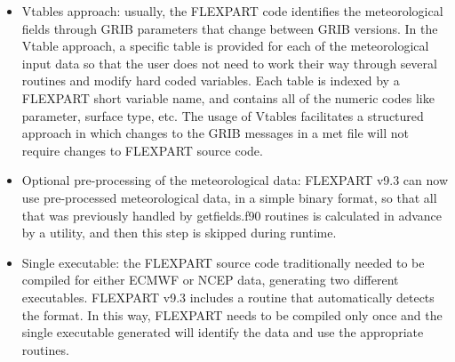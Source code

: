 \documentclass{egu}                  %
\begin{document}
\begin{itemize} 

\item Vtables approach: usually, the FLEXPART code identifies the meteorological fields through GRIB parameters that change between GRIB versions. In the Vtable approach, a specific table is provided for each of the meteorological input data so that the user does not need to work their way through several routines and modify hard coded variables. Each table is indexed by a FLEXPART short variable name, and contains all of the numeric codes like parameter, surface type, etc. The usage of Vtables facilitates a structured approach in which changes to the GRIB messages in a met file will not require changes to FLEXPART source code.  

\item Optional pre-processing of the meteorological data: FLEXPART v9.3 can now use pre-processed meteorological data, in a simple binary format, so that all that was previously handled by getfields.f90 routines is calculated in advance by a utility, and then this step is  skipped during runtime.

\item Single executable: the FLEXPART source code traditionally needed to be compiled for either ECMWF or NCEP data, generating two different executables. FLEXPART v9.3 includes a routine that automatically detects the format. In this way, FLEXPART needs to be compiled only once and the single executable generated will identify the data and use the appropriate routines.  
\end{itemize}

\end{document}
